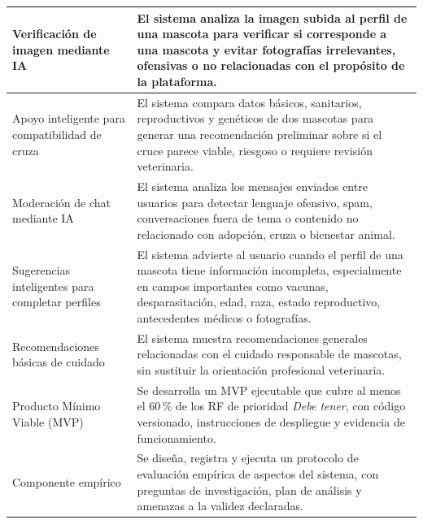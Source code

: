 \documentclass[journal,onecolumn]{IEEEtran}
\begin{document}
\begin{longtable}{|p{4cm}|p{11cm}|}
		\hline
		Verificación de imagen mediante IA & El sistema analiza la imagen subida al perfil de una mascota para verificar si corresponde a una mascota y evitar fotografías irrelevantes, ofensivas o no relacionadas con el propósito de la plataforma. \\
		\hline
		Apoyo inteligente para compatibilidad de cruza & El sistema compara datos básicos, sanitarios, reproductivos y genéticos de dos mascotas para generar una recomendación preliminar sobre si el cruce parece viable, riesgoso o requiere revisión veterinaria. \\
		\hline
		Moderación de chat mediante IA & El sistema analiza los mensajes enviados entre usuarios para detectar lenguaje ofensivo, spam, conversaciones fuera de tema o contenido no relacionado con adopción, cruza o bienestar animal. \\
		\hline
		Sugerencias inteligentes para completar perfiles & El sistema advierte al usuario cuando el perfil de una mascota tiene información incompleta, especialmente en campos importantes como vacunas, desparasitación, edad, raza, estado reproductivo, antecedentes médicos o fotografías. \\
		\hline
		Recomendaciones básicas de cuidado & El sistema muestra recomendaciones generales relacionadas con el cuidado responsable de mascotas, sin sustituir la orientación profesional veterinaria. \\
		\hline
		Producto Mínimo Viable (MVP) & Se desarrolla un MVP ejecutable que cubre al menos el 60\,\% de los RF de prioridad \emph{Debe tener}, con código versionado, instrucciones de despliegue y evidencia de funcionamiento. \\
		\hline
		Componente empírico & Se diseña, registra y ejecuta un protocolo de evaluación empírica de aspectos del sistema, con preguntas de investigación, plan de análisis y amenazas a la validez declaradas. \\
		\hline
	\end{longtable}
	
\end{document}
